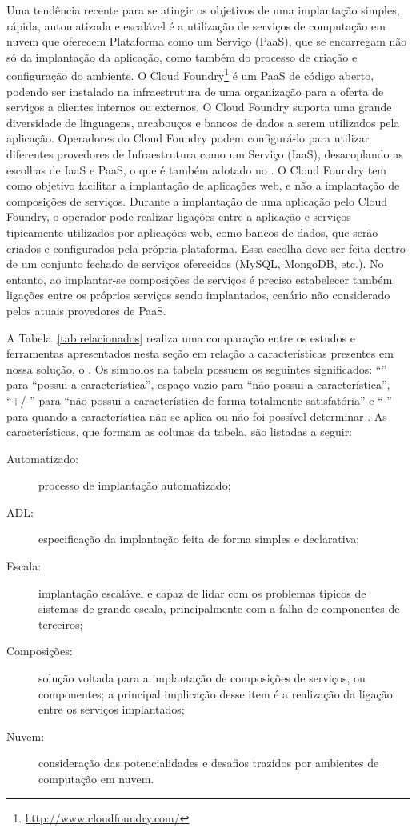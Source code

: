 Uma tendência recente para se atingir os objetivos de uma implantação simples, rápida, automatizada e escalável é a utilização de serviços de computação em nuvem que oferecem Plataforma como um Serviço (PaaS), que se encarregam não só da implantação da aplicação, como também do processo de criação e configuração do ambiente. O Cloud Foundry\footnote{\url{http://www.cloudfoundry.com/}} é um PaaS de código aberto, podendo ser instalado na infraestrutura de uma organização para a oferta de serviços a clientes internos ou externos. O Cloud Foundry suporta uma grande diversidade de linguagens, arcabouços e bancos de dados a serem utilizados pela aplicação. Operadores do Cloud Foundry podem configurá-lo para utilizar diferentes provedores de Infraestrutura como um Serviço (IaaS), desacoplando as escolhas de IaaS e PaaS, o que é também adotado no \ee. O Cloud Foundry tem como objetivo facilitar a implantação de aplicações web, e não a implantação de composições de serviços. Durante a implantação de uma aplicação pelo Cloud Foundry, o operador pode realizar ligações entre a aplicação e serviços tipicamente utilizados por aplicações web, como bancos de dados, que serão criados e configurados pela própria plataforma. Essa escolha deve ser feita dentro de um conjunto fechado de serviços oferecidos (MySQL, MongoDB, etc.). No entanto, ao implantar-se composições de serviços é preciso estabelecer também ligações entre os próprios serviços sendo implantados, cenário não considerado pelos atuais provedores de PaaS.

A Tabela~\ref{tab:relacionados} realiza uma comparação entre os estudos e ferramentas apresentados nesta seção em relação a características presentes em nossa solução, o \ee. Os símbolos na tabela possuem os seguintes significados: ``\checkmark{}'' para ``possui a característica'', espaço vazio para ``não possui a característica'', ``+/-'' para ``não possui a característica de forma totalmente satisfatória'' e ``-'' para quando a característica não se aplica ou não foi possível determinar . As características, que formam as colunas da tabela, são listadas a seguir:

\begin{description}
\item [Automatizado:] processo de implantação automatizado;
\item [ADL:] especificação da implantação feita de forma simples e declarativa;
\item [Escala:] implantação escalável e capaz de lidar com os problemas típicos de sistemas de grande escala, principalmente com a falha de componentes de terceiros;
\item [Composições:] solução voltada para a implantação de composições de serviços, ou componentes; a principal implicação desse item é a realização da ligação entre os serviços implantados;
\item [Nuvem:] consideração das potencialidades e desafios trazidos por ambientes de computação em nuvem.
\end{description}

